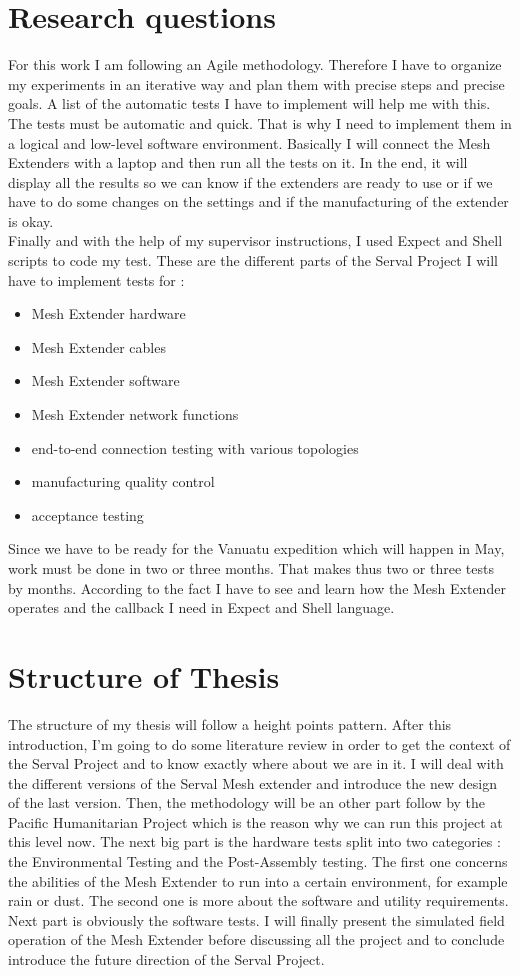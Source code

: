 \section{Research questions}
For this work I am following an Agile methodology. Therefore I have to organize my experiments in an iterative way and plan them with precise steps and precise goals. A list of the automatic tests I have to implement will help me with this. \\
The tests must be automatic and quick. That is why I need to implement them in a logical and low-level software environment. Basically I will connect the Mesh Extenders with a laptop and then run all the tests on it. In the end, it will display all the results so we can know if the extenders are ready to use or if we have to do some changes on the settings and if the manufacturing of the extender is okay. \\
Finally and with the help of my supervisor instructions, I used Expect and Shell scripts to code my test. 
These are the different parts of the Serval Project I will have to implement tests for : 
\begin{itemize}
\item Mesh Extender hardware 
\item Mesh Extender cables
\item Mesh Extender software 
\item Mesh Extender network functions
\item end-to-end connection testing with various topologies
\item manufacturing quality control 
\item acceptance testing
\end{itemize}
Since we have to be ready for the Vanuatu expedition which will happen in May, work must be done in two or three months. That makes thus two or three tests by months. According to the fact I have to see and learn how the Mesh Extender operates and the callback I need in Expect and Shell language. 


\section{Structure of Thesis}
The structure of my thesis will follow a height points pattern. After this introduction, I'm going to do some literature review in order to get the context of the Serval Project and to know exactly where about we are in it. I will deal with the different versions of the Serval Mesh extender and introduce the new design of the last version. Then, the methodology will be an other part follow by the Pacific Humanitarian Project which is the reason why we can run this project at this level now. The next big part is the hardware tests split into two categories : the Environmental Testing and the Post-Assembly testing. The first one concerns the abilities of the Mesh Extender to run into a certain environment, for example rain or dust. The second one is more about the software and utility requirements. Next part is obviously the software tests. I will finally present the simulated field operation of the Mesh Extender before discussing all the project and to conclude introduce the future direction of the Serval Project.